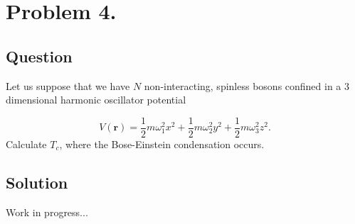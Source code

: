 \section*{Problem 4.}
\subsection*{Question}
Let us suppose that we have $N$ non-interacting, spinless bosons confined in a $3$ dimensional harmonic oscillator potential

\begin{equation}
V \left( \boldsymbol{r} \right)
=
\frac{1}{2} m \omega_{1}^{2} x^{2}
+
\frac{1}{2} m \omega_{2}^{2} y^{2}
+
\frac{1}{2} m \omega_{3}^{2} z^{2}.
\end{equation}
Calculate $T_{c}$, where the Bose-Einstein condensation occurs.

\subsection*{Solution}
Work in progress...


